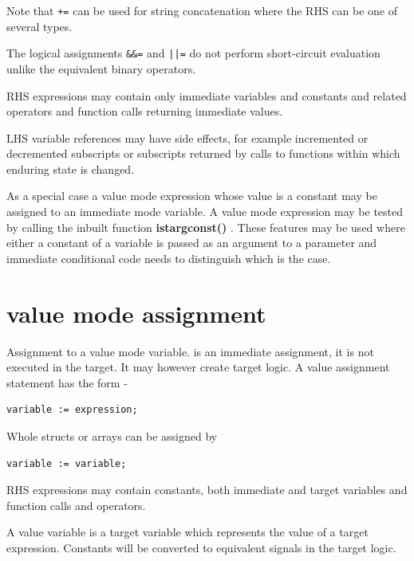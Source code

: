         Note that \verb'+=' can be used for string concatenation where the
        RHS can be one of several types.
        
        The logical assignments \verb'&&=' and  \verb'||=' do not perform
        short-circuit evaluation unlike the equivalent binary operators.

        RHS expressions may contain only immediate variables and constants
        and related operators and function calls returning immediate values.
        
        LHS variable references may have side effects, for example incremented
        or decremented subscripts or subscripts returned by calls to functions
        within which enduring state is changed.
        
        As a special case a value mode expression whose value is a constant
        may be assigned to an immediate mode variable. A value mode expression
        may be tested by calling the inbuilt function {\bf istargconst()}
        . These features may be used where
        either a constant of a variable is passed as an argument to a parameter
        and immediate conditional code needs to distinguish which is the case.


    \section{value mode assignment}\label{sec:im_valass}

        Assignment to a value mode variable.
        is an immediate assignment, it is not executed in the target. It may
        however create target logic.
        A value assignment statement has the form -
        \begin{lstlisting}[gobble=8, language=threepl]
               variable := expression;
        \end{lstlisting}
        
        Whole structs or arrays can be assigned by
        \begin{lstlisting}[gobble=8, language=threepl]
               variable := variable;
        \end{lstlisting}

        RHS expressions may contain constants, both immediate and target
        variables and function calls and operators.
        
        A value variable is a target variable which represents the value of a
        target expression. Constants will be converted to equivalent signals in
        the target logic.
        
